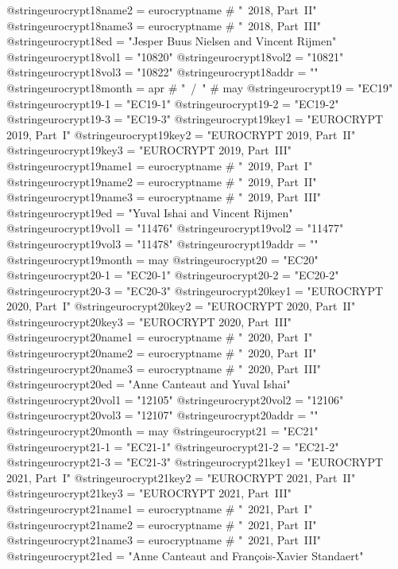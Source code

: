 @string{eurocrypt18name2 =      eurocryptname # "~2018, Part~II"}
@string{eurocrypt18name3 =      eurocryptname # "~2018, Part~III"}
@string{eurocrypt18ed =         "Jesper Buus Nielsen and Vincent Rijmen"}
@string{eurocrypt18vol1 =       "10820"}
@string{eurocrypt18vol2 =       "10821"}
@string{eurocrypt18vol3 =       "10822"}
@string{eurocrypt18addr =       ""}
@string{eurocrypt18month =      apr # "~/~" # may}
@string{eurocrypt19 =           "EC19"}
@string{eurocrypt19-1 =         "EC19-1"}
@string{eurocrypt19-2 =         "EC19-2"}
@string{eurocrypt19-3 =         "EC19-3"}
@string{eurocrypt19key1 =       "EUROCRYPT 2019, Part~I"}
@string{eurocrypt19key2 =       "EUROCRYPT 2019, Part~II"}
@string{eurocrypt19key3 =       "EUROCRYPT 2019, Part~III"}
@string{eurocrypt19name1 =      eurocryptname # "~2019, Part~I"}
@string{eurocrypt19name2 =      eurocryptname # "~2019, Part~II"}
@string{eurocrypt19name3 =      eurocryptname # "~2019, Part~III"}
@string{eurocrypt19ed =         "Yuval Ishai and Vincent Rijmen"}
@string{eurocrypt19vol1 =       "11476"}
@string{eurocrypt19vol2 =       "11477"}
@string{eurocrypt19vol3 =       "11478"}
@string{eurocrypt19addr =       ""}
@string{eurocrypt19month =      may}
@string{eurocrypt20 =           "EC20"}
@string{eurocrypt20-1 =         "EC20-1"}
@string{eurocrypt20-2 =         "EC20-2"}
@string{eurocrypt20-3 =         "EC20-3"}
@string{eurocrypt20key1 =       "EUROCRYPT 2020, Part~I"}
@string{eurocrypt20key2 =       "EUROCRYPT 2020, Part~II"}
@string{eurocrypt20key3 =       "EUROCRYPT 2020, Part~III"}
@string{eurocrypt20name1 =      eurocryptname # "~2020, Part~I"}
@string{eurocrypt20name2 =      eurocryptname # "~2020, Part~II"}
@string{eurocrypt20name3 =      eurocryptname # "~2020, Part~III"}
@string{eurocrypt20ed =         "Anne Canteaut and Yuval Ishai"}
@string{eurocrypt20vol1 =       "12105"}
@string{eurocrypt20vol2 =       "12106"}
@string{eurocrypt20vol3 =       "12107"}
@string{eurocrypt20addr =       ""}
@string{eurocrypt20month =      may}
@string{eurocrypt21 =           "EC21"}
@string{eurocrypt21-1 =         "EC21-1"}
@string{eurocrypt21-2 =         "EC21-2"}
@string{eurocrypt21-3 =         "EC21-3"}
@string{eurocrypt21key1 =       "EUROCRYPT 2021, Part~I"}
@string{eurocrypt21key2 =       "EUROCRYPT 2021, Part~II"}
@string{eurocrypt21key3 =       "EUROCRYPT 2021, Part~III"}
@string{eurocrypt21name1 =      eurocryptname # "~2021, Part~I"}
@string{eurocrypt21name2 =      eurocryptname # "~2021, Part~II"}
@string{eurocrypt21name3 =      eurocryptname # "~2021, Part~III"}
@string{eurocrypt21ed =         "Anne Canteaut and Fran\c{c}ois-Xavier Standaert"}
